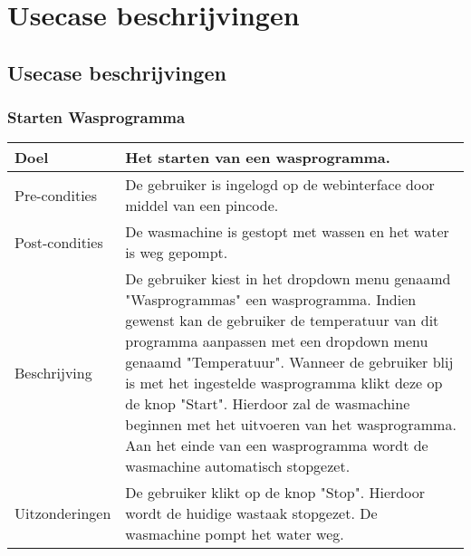 \chapter{Usecase beschrijvingen}
\section{Usecase beschrijvingen}

\subsection{Starten Wasprogramma}

\begin{center}
  \begin{tabular}{ | p{4cm} | p{8.5cm} | } %
    \hline
    Doel & Het starten van een wasprogramma. \\ \hline
    Pre-condities & De gebruiker is ingelogd op de webinterface door middel van een pincode. \\ \hline
    Post-condities & De wasmachine is gestopt met wassen en het water is weg gepompt. \\ \hline
    Beschrijving & De gebruiker kiest in het dropdown menu genaamd "Wasprogrammas" een wasprogramma. Indien gewenst kan de gebruiker de temperatuur van dit programma aanpassen met een dropdown menu genaamd "Temperatuur". Wanneer de gebruiker blij is met het ingestelde wasprogramma klikt deze op de knop "Start". Hierdoor zal de wasmachine beginnen met het uitvoeren van het wasprogramma. Aan het einde van een wasprogramma wordt de wasmachine automatisch stopgezet.\\ \hline
	Uitzonderingen & De gebruiker klikt op de knop "Stop". Hierdoor wordt de huidige wastaak stopgezet. De wasmachine pompt het water weg. \\
    \hline
  \end{tabular}
\end{center}